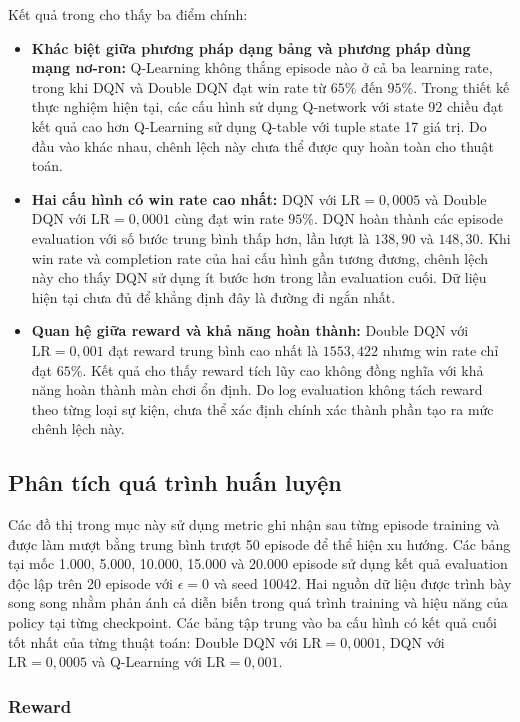 Kết quả trong  cho thấy ba điểm chính:
\begin{itemize}
    \item \textbf{Khác biệt giữa phương pháp dạng bảng và phương pháp dùng mạng nơ-ron:} Q-Learning không thắng episode nào ở cả ba learning rate, trong khi DQN và Double DQN đạt win rate từ $65\%$ đến $95\%$. Trong thiết kế thực nghiệm hiện tại, các cấu hình sử dụng Q-network với state 92 chiều đạt kết quả cao hơn Q-Learning sử dụng Q-table với tuple state 17 giá trị. Do đầu vào khác nhau, chênh lệch này chưa thể được quy hoàn toàn cho thuật toán.
    \item \textbf{Hai cấu hình có win rate cao nhất:} DQN với $\mathrm{LR}=0{,}0005$ và Double DQN với $\mathrm{LR}=0{,}0001$ cùng đạt win rate $95\%$. DQN hoàn thành các episode evaluation với số bước trung bình thấp hơn, lần lượt là $138{,}90$ và $148{,}30$. Khi win rate và completion rate của hai cấu hình gần tương đương, chênh lệch này cho thấy DQN sử dụng ít bước hơn trong lần evaluation cuối. Dữ liệu hiện tại chưa đủ để khẳng định đây là đường đi ngắn nhất.
    \item \textbf{Quan hệ giữa reward và khả năng hoàn thành:} Double DQN với $\mathrm{LR}=0{,}001$ đạt reward trung bình cao nhất là $1553{,}422$ nhưng win rate chỉ đạt $65\%$. Kết quả cho thấy reward tích lũy cao không đồng nghĩa với khả năng hoàn thành màn chơi ổn định. Do log evaluation không tách reward theo từng loại sự kiện, chưa thể xác định chính xác thành phần tạo ra mức chênh lệch này.
\end{itemize}

\subsection{Phân tích quá trình huấn luyện}

Các đồ thị trong mục này sử dụng metric ghi nhận sau từng episode training và được làm mượt bằng trung bình trượt 50 episode để thể hiện xu hướng. Các bảng tại mốc 1.000, 5.000, 10.000, 15.000 và 20.000 episode sử dụng kết quả evaluation độc lập trên 20 episode với $\epsilon=0$ và seed 10042. Hai nguồn dữ liệu được trình bày song song nhằm phản ánh cả diễn biến trong quá trình training và hiệu năng của policy tại từng checkpoint. Các bảng tập trung vào ba cấu hình có kết quả cuối tốt nhất của từng thuật toán: Double DQN với $\mathrm{LR}=0{,}0001$, DQN với $\mathrm{LR}=0{,}0005$ và Q-Learning với $\mathrm{LR}=0{,}001$.

\subsubsection{Reward}

